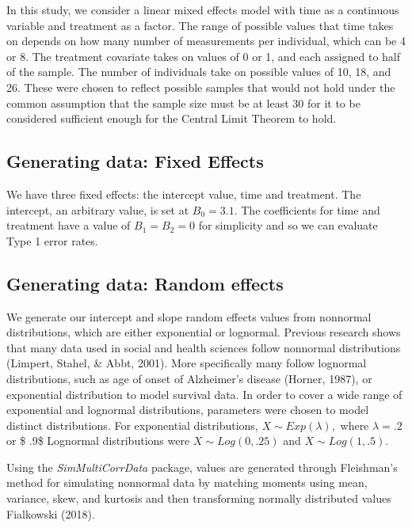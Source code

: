\documentclass[12pt, twoside]{amherstthesis}
\begin{document}
In this study, we consider a linear mixed effects model with time as a continuous variable and treatment as a factor. The range of possible values that time takes on depends on how many number of measurements per individual, which can be 4 or 8. The treatment covariate takes on values of 0 or 1, and each assigned to half of the sample. The number of individuals take on possible values of 10, 18, and 26. These were chosen to reflect possible samples that would not hold under the common assumption that the sample size must be at least 30 for it to be considered sufficient enough for the Central Limit Theorem to hold.

\hypertarget{generating-data-fixed-effects}{%
\subsection{Generating data: Fixed Effects}\label{generating-data-fixed-effects}}

We have three fixed effects: the intercept value, time and treatment. The intercept, an arbitrary value, is set at \(B_0 = 3.1\). The coefficients for time and treatment have a value of \(B_1 = B_2 = 0\) for simplicity and so we can evaluate Type 1 error rates.

\hypertarget{generating-data-random-effects}{%
\subsection{Generating data: Random effects}\label{generating-data-random-effects}}

We generate our intercept and slope random effects values from nonnormal distributions, which are either exponential or lognormal. Previous research shows that many data used in social and health sciences follow nonnormal distributions (Limpert, Stahel, \& Abbt, 2001). More specifically many follow lognormal distributions, such as age of onset of Alzheimer's disease (Horner, 1987), or exponential distribution to model survival data. In order to cover a wide range of exponential and lognormal distributions, parameters were chosen to model distinct distributions. For exponential distributions, \(X\sim\mathit{Exp}(\lambda),\) where \(\lambda = .2\) or \$ .9\$ Lognormal distributions were \(X\sim\mathit{Log}(0,.25)\) and \(X\sim\mathit{Log}(1,.5).\)

Using the \emph{SimMultiCorrData} package, values are generated through Fleishman's method for simulating nonnormal data by matching moments using mean, variance, skew, and kurtosis and then transforming normally distributed values Fialkowski (2018).
\end{document}
